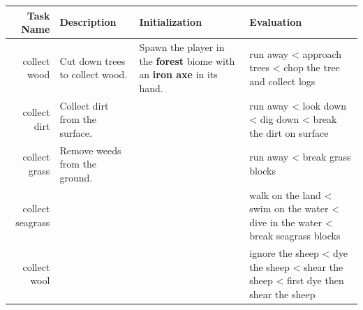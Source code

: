 
\begin{adjustbox}{maximize}
\footnotesize

\begin{tabularx}{\linewidth}{r|p{2.5cm}|Y|Y}
\toprule
\textbf{Task Name} & \textbf{Description} & \textbf{Initialization} & \textbf{Evaluation} \\ \midrule

collect wood & Cut down trees to collect wood. & Spawn the player in the \textbf{forest} biome with an \textbf{iron axe} in its hand. & run away < approach trees < chop the tree and collect logs \\ \midrule

collect dirt & Collect dirt from the surface. & & run away < look down < dig down < break the dirt on surface \\ \midrule

collect grass & Remove weeds from the ground.  & & run away < break grass blocks \\ \midrule

collect seagrass & & & walk on the land < swim on the water < dive in the water < break seagrass blocks \\ \midrule

collect wool & & & ignore the sheep < dye the sheep < shear the sheep < first dye then shear the sheep \\

\bottomrule
\end{tabularx}
\end{adjustbox}